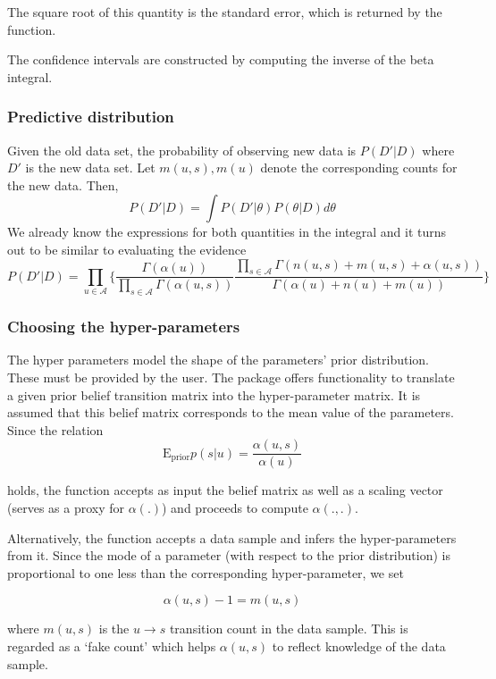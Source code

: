 \documentclass[
  nojss]{jss}
\begin{document}
The square root of this quantity is the standard error, which is returned by the function.

The confidence intervals are constructed by computing the inverse of the beta integral.

\hypertarget{predictive-distribution}{%
\subsubsection{Predictive distribution}\label{predictive-distribution}}

Given the old data set, the probability of observing new data is \(P(D'|D)\) where \(D'\) is the new data set. Let \(m(u, s), m(u)\) denote the corresponding counts for the new data. Then,
\[
P(D'|D) = \int P(D' | \theta) P(\theta | D) d\theta
\]
We already know the expressions for both quantities in the integral and it turns out to be similar to evaluating the evidence
\[
P(D'|D) = \prod_{u \in \mathcal{A}} \Big\{ \frac{\Gamma(\alpha(u))}{\prod_{s \in \mathcal{A}} \Gamma(\alpha(u, s))} \frac{\prod_{s \in \mathcal{A}} \Gamma(n(u, s) + m(u, s) + \alpha(u, s))}{\Gamma(\alpha(u) + n(u) + m(u))} \Big\}
\]

\hypertarget{choosing-the-hyper-parameters}{%
\subsubsection{Choosing the hyper-parameters}\label{choosing-the-hyper-parameters}}

The hyper parameters model the shape of the parameters' prior distribution. These must be provided by the user. The package offers functionality to translate a given prior belief transition matrix into the hyper-parameter matrix. It is assumed that this belief matrix corresponds to the mean value of the parameters. Since the relation
\[
\text{E}_{\text{prior}} p(s | u) = \frac{\alpha(u, s)}{\alpha(u)}
\]

holds, the function accepts as input the belief matrix as well as a scaling vector (serves as a proxy for \(\alpha(.)\)) and proceeds to compute \(\alpha(., .)\).

Alternatively, the function accepts a data sample and infers the hyper-parameters from it. Since the mode of a parameter (with respect to the prior distribution) is proportional to one less than the corresponding hyper-parameter, we set

\[
\alpha(u, s) - 1 = m(u, s)
\]

where \(m(u, s)\) is the \(u\rightarrow s\) transition count in the data sample. This is regarded as a `fake count' which helps \(\alpha(u, s)\) to reflect knowledge of the data sample.
\end{document}
